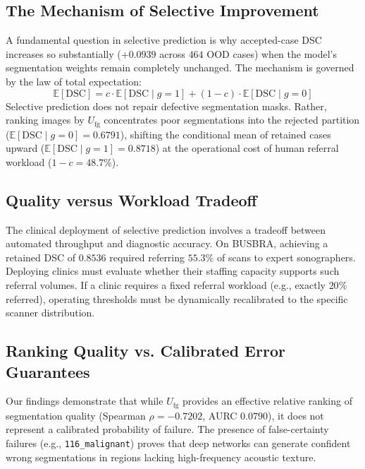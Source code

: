 \documentclass[10pt,journal,compsoc]{IEEEtran}
\begin{document}
\subsection{The Mechanism of Selective Improvement}
A fundamental question in selective prediction is why accepted-case DSC increases so substantially ($+0.0939$ across $464$ OOD cases) when the model's segmentation weights remain completely unchanged. The mechanism is governed by the law of total expectation:
\begin{equation}
\mathbb{E}[\mathrm{DSC}] = c \cdot \mathbb{E}[\mathrm{DSC} \mid g=1] + (1 - c) \cdot \mathbb{E}[\mathrm{DSC} \mid g=0]
\end{equation}
Selective prediction does not repair defective segmentation masks. Rather, ranking images by $U_{\mathrm{fg}}$ concentrates poor segmentations into the rejected partition ($\mathbb{E}[\mathrm{DSC} \mid g=0] = 0.6791$), shifting the conditional mean of retained cases upward ($\mathbb{E}[\mathrm{DSC} \mid g=1] = 0.8718$) at the operational cost of human referral workload ($1 - c = 48.7\%$).

\subsection{Quality versus Workload Tradeoff}
The clinical deployment of selective prediction involves a tradeoff between automated throughput and diagnostic accuracy. On BUSBRA, achieving a retained DSC of $0.8536$ required referring $55.3\%$ of scans to expert sonographers. Deploying clinics must evaluate whether their staffing capacity supports such referral volumes. If a clinic requires a fixed referral workload (e.g., exactly $20\%$ referred), operating thresholds must be dynamically recalibrated to the specific scanner distribution.

\subsection{Ranking Quality vs. Calibrated Error Guarantees}
Our findings demonstrate that while $U_{\mathrm{fg}}$ provides an effective relative ranking of segmentation quality (Spearman $\rho = -0.7202$, AURC $0.0790$), it does not represent a calibrated probability of failure. The presence of false-certainty failures (e.g., \texttt{116\_malignant}) proves that deep networks can generate confident wrong segmentations in regions lacking high-frequency acoustic texture.
\end{document}
